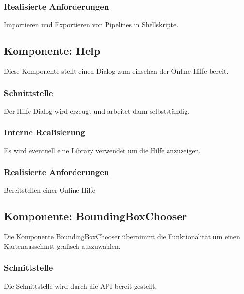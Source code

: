 \documentclass[a4paper,12pt]{scrartcl}
\begin{document}
\subsubsection{Realisierte Anforderungen}
Importieren und Exportieren von Pipelines in Shellskripte.

\subsection{Komponente: Help}
Diese Komponente stellt einen Dialog zum einsehen der Online-Hilfe bereit.
\subsubsection{Schnittstelle}
Der Hilfe Dialog wird erzeugt und arbeitet dann selbstständig.
\subsubsection{Interne Realisierung}
Es wird eventuell eine Library verwendet um die Hilfe anzuzeigen.
\subsubsection{Realisierte Anforderungen}
Bereitstellen einer Online-Hilfe
\subsection{Komponente: BoundingBoxChooser}
Die Komponente BoundingBoxChooser übernimmt die Funktionalität um einen Kartenausschnitt grafisch auszuwählen.
\subsubsection{Schnittstelle}
Die Schnittstelle wird durch die API bereit gestellt.
\end{document}
